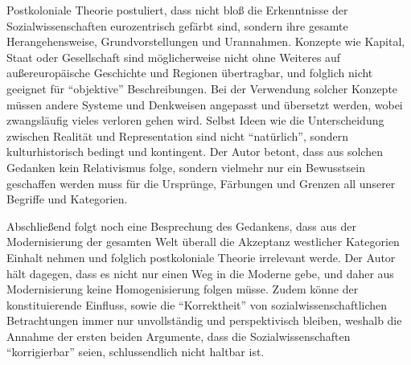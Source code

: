 \documentclass[a4paper, 12pt]{article}
\begin{document}
\begin{onehalfspace}
Postkoloniale Theorie postuliert, dass nicht bloß die Erkenntnisse der Sozialwissenschaften eurozentrisch gefärbt sind, sondern ihre gesamte Herangehensweise, Grundvorstellungen und Urannahmen. Konzepte wie Kapital, Staat oder Gesellschaft sind möglicherweise nicht ohne Weiteres auf außereuropäische Geschichte und Regionen über\-tragbar, und folglich nicht geeignet für "`objektive"' Beschreibungen. Bei der Verwendung solcher Konzepte müssen andere Systeme und Denkweisen angepasst und übersetzt werden, wobei zwangsläufig vieles verloren gehen wird. Selbst Ideen wie die Unterscheidung zwischen Realität und Representation sind nicht “natürlich”, sondern kulturhistorisch bedingt und kontingent. Der Autor betont, dass aus solchen Gedanken kein Relativismus folge, sondern vielmehr nur ein Bewusstsein geschaffen werden muss für die Ursprünge, Färbungen und Grenzen all unserer Begriffe und Kategorien.

Abschließend folgt noch eine Besprechung des Gedankens, dass aus der Modernisierung der gesamten Welt überall die Akzeptanz westlicher Kategorien Einhalt nehmen und folglich postkoloniale Theorie irrelevant werde. Der Autor hält dagegen, dass es nicht nur einen Weg in die Moderne gebe, und daher aus Modernisierung keine Homogenisierung folgen müsse. Zudem könne der konstituierende Einfluss, sowie die "`Korrektheit"' von sozialwissenschaftlichen Betrachtungen immer nur unvollständig und perspektivisch bleiben, weshalb die Annahme der ersten beiden Argumente, dass die Sozialwissenschaften "`korrigierbar"' seien, schlussendlich nicht haltbar ist.


\end{onehalfspace}
\nocite{*}
%
\printbibliography
\end{document}

